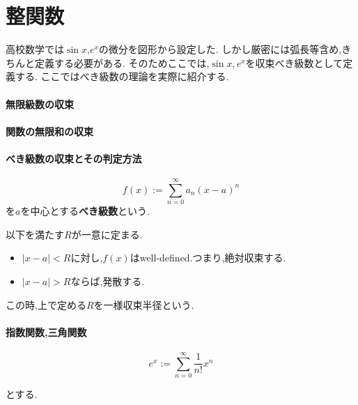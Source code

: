 \part{整関数}
高校数学では$\sin x$,$e^x$の微分を図形から設定した.
しかし厳密には弧長等含め,きちんと定義する必要がある.
そのためここでは,$\sin x, e^x$を収束べき級数として定義する.
ここではべき級数の理論を実際に紹介する.

\subsection{無限級数の収束}
\subsection{関数の無限和の収束}
\subsection{べき級数の収束とその判定方法}
\begin{screen}
\begin{dfn}
\begin{equation*}
 f(x) := \sum_{n=0}^{\infty} a_n(x -a)^n
\end{equation*}
を$a$を中心とする\textbf{べき級数}という.
\end{dfn}
\end{screen}

\begin{lem}
  以下を満たす$R$が一意に定まる.
  \begin{itemize}
    \item $|x -a | < R$に対し,$f(x)$はwell-defined.つまり,絶対収束する.
    \item $|x - a| >R$ならば,発散する.
  \end{itemize}
この時,上で定める$R$を一様収束半径という.
\end{lem}

\subsection{指数関数,三角関数}
\begin{screen}
\begin{dfn}
 \begin{equation*}
  e^x := \sum_{n=0}^{\infty} \frac{1}{n!}x^n
 \end{equation*}
\end{dfn}
\end{screen}
とする.
